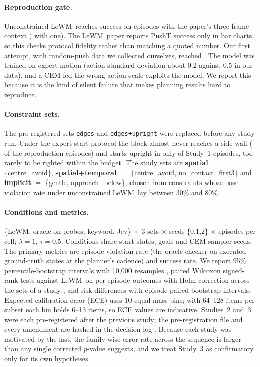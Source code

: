 \documentclass[11pt]{article}
\newcommand{\jev}{Jev}
\newcommand{\lewm}{LeWM}
\begin{document}
\paragraph{Reproduction gate.} Unconstrained \lewm\ reaches  success on  episodes with the paper's three-frame context ( with one). The \lewm\ paper reports PushT success only in bar charts, so this checks protocol fidelity rather than matching a quoted number. Our first attempt, with random-push data we collected ourselves, reached . The model was trained on expert motion (action standard deviation about 0.2 against 0.5 in our data), and a CEM fed the wrong action scale exploits the model. We report this because it is the kind of silent failure that makes planning results hard to reproduce.
\paragraph{Constraint sets.} The pre-registered sets \texttt{edges} and \texttt{edges+upright} were replaced before any study run. Under the expert-start protocol the block almost never reaches a side wall ( of the  reproduction episodes) and starts upright in only  of Study~1 episodes, too rarely to be righted within the budget. The study sets are \textbf{spatial} $=$ \{centre\_avoid\}, \textbf{spatial+temporal} $=$ \{centre\_avoid, no\_contact\_first3\} and \textbf{implicit} $=$ \{gentle, approach\_below\}, chosen from constraints whose base violation rate under unconstrained \lewm\ lay between 30\% and 80\%.
\paragraph{Conditions and metrics.} \{\lewm, oracle-on-probes, keyword, \jev\} $\times$ 3 sets $\times$ seeds \{0,1,2\} $\times$  episodes per cell; $\lambda=1$, $\tau=0.5$. Conditions share start states, goals and CEM sampler seeds. The primary metrics are episode violation rate (the oracle checker on executed ground-truth states at the planner's cadence) and success rate. We report 95\% percentile-bootstrap intervals with 10{,}000 resamples \citep{efron1979bootstrap}, paired Wilcoxon signed-rank tests against \lewm\ on per-episode outcomes \citep{wilcoxon1945} with Holm correction across the sets of a study \citep{holm1979}, and risk differences with episode-paired bootstrap intervals. Expected calibration error (ECE) \citep{guo2017calibration} uses 10 equal-mass bins; with 64--128 items per subset each bin holds 6--13 items, so ECE values are indicative. Studies~2 and~3 were each pre-registered after the previous study; the pre-registration file and every amendment are hashed in the decision log \citep{nosek2018prereg}. Because each study was motivated by the last, the family-wise error rate across the sequence is larger than any single corrected $p$-value suggests, and we treat Study~3 as confirmatory only for its own hypotheses.
\end{document}

